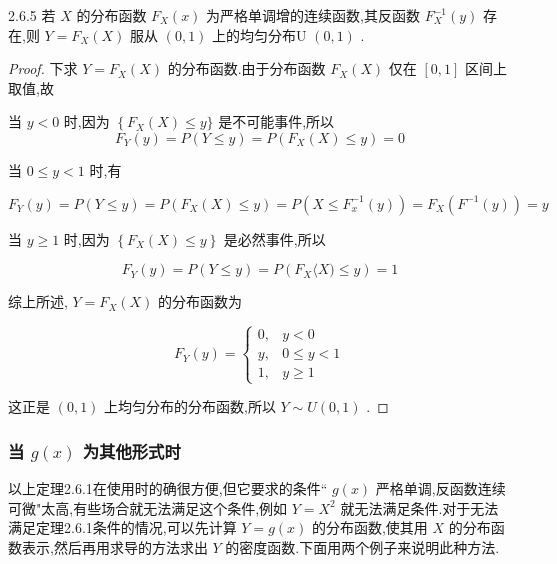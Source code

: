 \begin{theorem}{}{2.6.5}
	若 $ X $ 的分布函数 $ F_{X}(x) $ 为严格单调增的连续函数,其反函数 $ F_{X}^{-1}(y) $ 存在,则 $ Y=F_{X}(X) $ 服从 $ (0,1) $ 上的均匀分布U $ (0,1) $ .
\end{theorem}

\begin{proof}
	下求 $ Y=F_{X}(X) $ 的分布函数.由于分布函数 $ F_{X}(X) $ 仅在 $ [0,1] $ 区间上取值,故
	
	当 $ y<0 $ 时,因为 $ \left\{F_{X}(X) \leqslant y\right.\} $ 是不可能事件,所以 
	\[
	F_{Y}(y)=P(Y \leqslant y)=P\left(F_{X}(X) \leqslant y\right)=0
	\]
	
	当 $ 0 \leqslant y<1 $ 时,有
	
	\[
	F_{Y}(y)=P(Y \leqslant y)=P\left(F_{X}(X) \leqslant y\right)=P\left(X \leqslant F_{x}^{-1}(y)\right)=F_{X}\left(F^{-1}(y)\right)=y
	\]
	
	当 $ y \geqslant 1 $ 时,因为 $ \left\{F_{X}(X) \leqslant y\right\} $ 是必然事件,所以
	
	\[
	F_{Y}(y)=P(Y \leqslant y)=P\left(F_{X}\langle X) \leqslant y\right)=1
	\]
	
	综上所述, $ Y=F_{X}(X) $ 的分布函数为
	
	\[
	F_{Y}(y)=\left\{\begin{array}{ll}{0,} & {y<0} \\ {y,} & {0 \leqslant y<1} \\ {1,} & {y \geqslant 1}\end{array}\right.
	\]
	
	这正是 $ (0,1) $ 上均匀分布的分布函数,所以 $ Y \sim U(0,1) $ .
\end{proof}

\subsubsection{当 $ g(x) $ 为其他形式时}

以上定理2.6.1在使用时的确很方便,但它要求的条件`` $ g(x) $ 严格单调,反函数连续可微"太高,有些场合就无法满足这个条件,例如 $ Y=X^{2} $ 就无法满足条件.对于无法满足定理2.6.1条件的情况,可以先计算 $ Y=g(x) $ 的分布函数,使其用 $ X $ 的分布函数表示,然后再用求导的方法求出 $ Y $ 的密度函数.下面用两个例子来说明此种方法.

